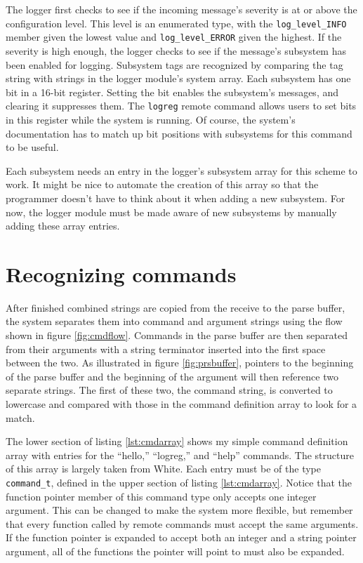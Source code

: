 The logger first checks to see if the incoming message's severity is at or above the configuration level.  This level is an enumerated type, with the \texttt{log\_level\_INFO} member given the lowest value and \texttt{log\_level\_ERROR} given the highest.  If the severity is high enough, the logger checks to see if the message's subsystem has been enabled for logging.  Subsystem tags are recognized by comparing the tag string with strings in the logger module's system array.  Each subsystem has one bit in a 16-bit register.  Setting the bit enables the subsystem's messages, and clearing it suppresses them.  The \texttt{logreg} remote command allows users to set bits in this register while the system is running.  Of course, the system's documentation has to match up bit positions with subsystems for this command to be useful. 

Each subsystem needs an entry in the logger's subsystem array for this scheme to work.  It might be nice to automate the creation of this array so that the programmer doesn't have to think about it when adding a new subsystem.  For now, the logger module must be made aware of new subsystems by manually adding these array entries.
      

\clearpage{}
\section{Recognizing commands}
After finished combined strings are copied from the receive to the parse buffer, the system separates them into command and argument strings using the flow shown in figure \ref{fig:cmdflow}.  Commands in the parse buffer are then separated from their arguments with a string terminator inserted into the first space between the two.  As illustrated in figure \ref{fig:prsbuffer}, pointers to the beginning of the parse buffer and the beginning of the argument will then reference two separate strings.  The first of these two, the command string, is converted to lowercase and compared with those in the command definition array to look for a match.

The lower section of listing \ref{lst:cmdarray} shows my simple command definition array with entries for the ``hello,'' ``logreg,'' and ``help'' commands. The structure of this array is largely taken from White\cite{bok:white2012}.  Each entry must be of the type \texttt{command\_t}, defined in the upper section of listing \ref{lst:cmdarray}.  Notice that the function pointer member of this command type only accepts one integer argument.  This can be changed to make the system more flexible, but remember that every function called by remote commands must accept the same arguments.  If the function pointer is expanded to accept both an integer and a string pointer argument, all of the functions the pointer will point to must also be expanded.  

